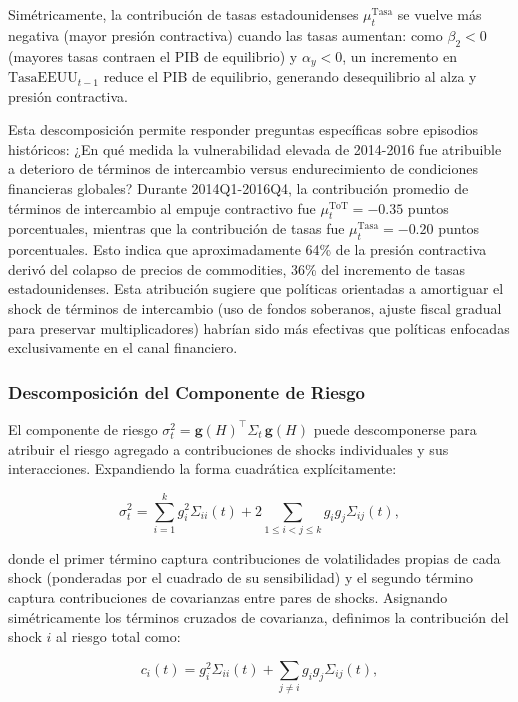 \documentclass[3p,11pt,draft,natbib=false]{elsarticle}
\newcommand{\vect}[1]{\boldsymbol{#1}}
\begin{document}
Simétricamente, la contribución de tasas estadounidenses $\mu_t^{\text{Tasa}}$ se vuelve más negativa (mayor presión contractiva) cuando las tasas aumentan: como $\beta_2 < 0$ (mayores tasas contraen el PIB de equilibrio) y $\alpha_y < 0$, un incremento en $\text{TasaEEUU}_{t-1}$ reduce el PIB de equilibrio, generando desequilibrio al alza y presión contractiva.

Esta descomposición permite responder preguntas específicas sobre episodios históricos: ¿En qué medida la vulnerabilidad elevada de 2014-2016 fue atribuible a deterioro de términos de intercambio versus endurecimiento de condiciones financieras globales? Durante 2014Q1-2016Q4, la contribución promedio de términos de intercambio al empuje contractivo fue $\mu_t^{\text{ToT}} = -0.35$ puntos porcentuales, mientras que la contribución de tasas fue $\mu_t^{\text{Tasa}} = -0.20$ puntos porcentuales. Esto indica que aproximadamente 64\% de la presión contractiva derivó del colapso de precios de commodities, 36\% del incremento de tasas estadounidenses. Esta atribución sugiere que políticas orientadas a amortiguar el shock de términos de intercambio (uso de fondos soberanos, ajuste fiscal gradual para preservar multiplicadores) habrían sido más efectivas que políticas enfocadas exclusivamente en el canal financiero.

\subsubsection{Descomposición del Componente de Riesgo}

El componente de riesgo $\sigma_t^2 = \vect{g}(H)^\top \Sigma_t\, \vect{g}(H)$ puede descomponerse para atribuir el riesgo agregado a contribuciones de shocks individuales y sus interacciones. Expandiendo la forma cuadrática explícitamente:

\begin{equation}
\sigma_t^2 = \sum_{i=1}^{k} g_i^2 \Sigma_{ii}(t) + 2\sum_{1 \leq i < j \leq k} g_i g_j \Sigma_{ij}(t),
\label{eq:risk_decomposition_explicit}
\end{equation}

donde el primer término captura contribuciones de volatilidades propias de cada shock (ponderadas por el cuadrado de su sensibilidad) y el segundo término captura contribuciones de covarianzas entre pares de shocks. Asignando simétricamente los términos cruzados de covarianza, definimos la contribución del shock $i$ al riesgo total como:

\begin{equation}
c_i(t) = g_i^2 \Sigma_{ii}(t) + \sum_{j \neq i} g_i g_j \Sigma_{ij}(t),
\label{eq:risk_contribution_i}
\end{equation}
\end{document}

